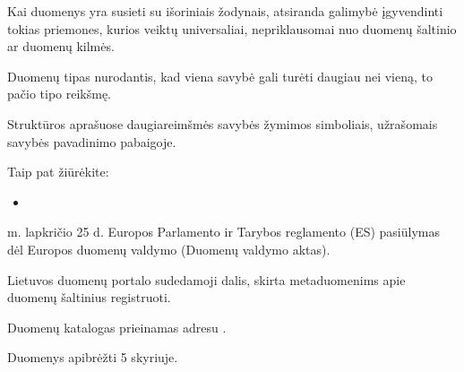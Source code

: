 \documentclass[letterpaper,10pt,lithuanian]{sphinxmanual}
\begin{document}
\begin{description}
\begin{description}
\sphinxAtStartPar
Kai duomenys yra susieti su išoriniais žodynais, atsiranda galimybė
įgyvendinti tokias priemones, kurios veiktų universaliai,
nepriklausomai nuo duomenų šaltinio ar duomenų kilmės.

\end{description}

\sphinxAtStartPar
Duomenų tipas nurodantis, kad viena savybė gali turėti daugiau nei
vieną, to pačio tipo reikšmę.

\sphinxAtStartPar
Struktūros aprašuose daugiareimšmės savybės žymimos \sphinxtitleref{{[}{]}} simboliais,
užrašomais savybės pavadinimo pabaigoje.


\begin{sphinxseealso}{Taip pat žiūrėkite:}
\begin{itemize}
\item {} 
\sphinxAtStartPar
{\hyperref[\detokenize{tipai:type.array}]{}}

\end{itemize}


\end{sphinxseealso}


 m. lapkričio 25 d. Europos Parlamento ir Tarybos reglamento (ES)
pasiūlymas  dėl Europos duomenų valdymo (Duomenų valdymo
aktas).

\sphinxAtStartPar
Lietuvos duomenų portalo sudedamoji dalis, skirta metaduomenims apie
duomenų šaltinius registruoti.

\sphinxAtStartPar
Duomenų katalogas prieinamas adresu .

\sphinxAtStartPar
Duomenys apibrėžti {\hyperref[\detokenize{savokos:term-atviru-duomenu-direktyva}]{}} 5 skyriuje.


\end{description}
\end{document}
